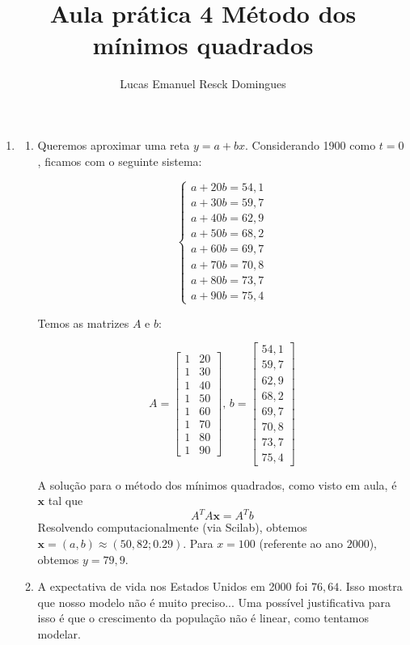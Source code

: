 \documentclass[11pt]{article}
\begin{document}
\author{Lucas Emanuel Resck Domingues}
\title{Aula prática 4
\medbreak
\large Método dos mínimos quadrados}
\maketitle

\medskip

\begin{enumerate}

\item 

\begin{enumerate}
    \item Queremos aproximar uma reta $y = a + bx$. Considerando 1900 como $t = 0$, ficamos com o seguinte sistema:
    
$$\begin{cases}
a + 20b = 54,1\\
a + 30b = 59,7\\
a + 40b = 62,9\\
a + 50b = 68,2\\
a + 60b = 69,7\\
a + 70b = 70,8\\
a + 80b = 73,7\\
a + 90b = 75,4
\end{cases}$$

Temos as matrizes $A$ e $b$:

$$A = \begin{bmatrix}
1&20\\
1&30\\
1&40\\
1&50\\
1&60\\
1&70\\
1&80\\
1&90
\end{bmatrix}\textrm{, }
b = \begin{bmatrix}
54,1\\
59,7\\
62,9\\
68,2\\
69,7\\
70,8\\
73,7\\
75,4
\end{bmatrix}$$

A solução para o método dos mínimos quadrados, como visto em aula, é $\mathbf{x}$ tal que
$$A^TA\mathbf{x}=A^Tb$$
Resolvendo computacionalmente (via Scilab), obtemos $\mathbf{x} = (a, b) \approx (50,82; 0.29)$. Para $x = 100$ (referente ao ano $2000$), obtemos $y = 79,9$.
\bigbreak
\item A expectativa de vida nos Estados Unidos em 2000 foi $76,64$. Isso mostra que nosso modelo não é muito preciso... Uma possível justificativa para isso é que o crescimento da população não é linear, como tentamos modelar.


\end{enumerate}
\end{enumerate}
\end{document}
